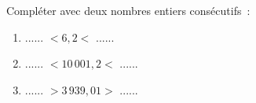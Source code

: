 \documentclass[exercice]{thedocument}%
\begin{document}
%
Compléter avec deux nombres entiers consécutifs~:
\begin{enumerate}
    \item $\text{...... }<6,2<\text{ ...... }$
    \item $\text{...... }<10\,001,2<\text{ ...... }$
    \item $\text{...... }>3\,939,01>\text{ ...... }$
\end{enumerate}
\end{document}
